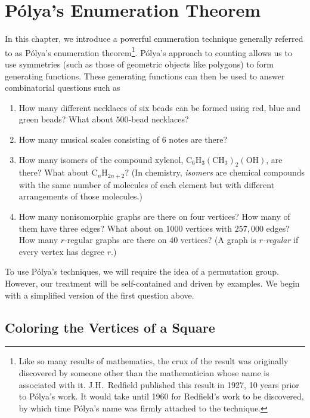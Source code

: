 
\chapter{P\'olya's Enumeration Theorem}\label{ch:polya}

In this chapter, we introduce a powerful enumeration technique
generally referred to as P\'olya's enumeration theorem\footnote{Like
  so many results of mathematics, the crux of the result was
  originally discovered by someone other than the mathematician whose
  name is associated with it. J.H.\ Redfield published this result in
  1927, 10 years prior to P\'olya's work. It would take until 1960 for
  Redfield's work to be discovered, by which time P\'olya's name was
  firmly attached to the technique.}. P\'olya's approach to counting
allows us to use symmetries (such as those of geometric objects like
polygons) to form generating functions. These generating functions can
then be used to answer combinatorial questions such as

\begin{enumerate}
\item How many different necklaces of six beads can be formed using
  red, blue and green beads? What about $500$-bead necklaces?
\item How many musical scales consisting of $6$ notes are there?
\item How many isomers of the compound xylenol,
  $\text{C}_6\text{H}_3(\text{CH}_3)_2(\text{OH})$, are there? What
  about $\text{C}_n \text{H}_{2n+2}$? (In chemistry, \emph{isomers}
  are chemical compounds with the same number of molecules of each
  element but with different arrangements of those molecules.)
\item How many nonisomorphic graphs are there on four vertices? How
  many of them have three edges? What about on $1000$ vertices with
  $257,000$ edges? How many $r$-regular graphs are there on $40$
  vertices? (A graph is $r$\emph{-regular} if every vertex has degree
  $r$.)
\end{enumerate}

To use P\'olya's techniques, we will require the idea of a permutation
group. However, our treatment will be self-contained and driven by
examples. We begin with a simplified version of the first question above.

\section{Coloring the Vertices of a Square}\label{s:polya:square}

